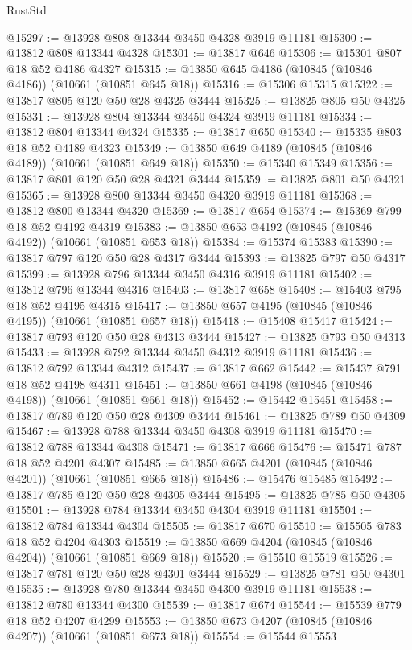 \begin{lexlean}{RustStd}
\begin{coremodule}
@15297 := @13928 @808 @13344 @3450 @4328 @3919 @11181
@15300 := @13812 @808 @13344 @4328
@15301 := @13817 @646
@15306 := @15301 @807 @18 @52 @4186 @4327
@15315 := @13850 @645 @4186 (@10845 (@10846 @4186)) (@10661 (@10851 @645 @18))
@15316 := @15306 @15315
@15322 := @13817 @805 @120 @50 @28 @4325 @3444
@15325 := @13825 @805 @50 @4325
@15331 := @13928 @804 @13344 @3450 @4324 @3919 @11181
@15334 := @13812 @804 @13344 @4324
@15335 := @13817 @650
@15340 := @15335 @803 @18 @52 @4189 @4323
@15349 := @13850 @649 @4189 (@10845 (@10846 @4189)) (@10661 (@10851 @649 @18))
@15350 := @15340 @15349
@15356 := @13817 @801 @120 @50 @28 @4321 @3444
@15359 := @13825 @801 @50 @4321
@15365 := @13928 @800 @13344 @3450 @4320 @3919 @11181
@15368 := @13812 @800 @13344 @4320
@15369 := @13817 @654
@15374 := @15369 @799 @18 @52 @4192 @4319
@15383 := @13850 @653 @4192 (@10845 (@10846 @4192)) (@10661 (@10851 @653 @18))
@15384 := @15374 @15383
@15390 := @13817 @797 @120 @50 @28 @4317 @3444
@15393 := @13825 @797 @50 @4317
@15399 := @13928 @796 @13344 @3450 @4316 @3919 @11181
@15402 := @13812 @796 @13344 @4316
@15403 := @13817 @658
@15408 := @15403 @795 @18 @52 @4195 @4315
@15417 := @13850 @657 @4195 (@10845 (@10846 @4195)) (@10661 (@10851 @657 @18))
@15418 := @15408 @15417
@15424 := @13817 @793 @120 @50 @28 @4313 @3444
@15427 := @13825 @793 @50 @4313
@15433 := @13928 @792 @13344 @3450 @4312 @3919 @11181
@15436 := @13812 @792 @13344 @4312
@15437 := @13817 @662
@15442 := @15437 @791 @18 @52 @4198 @4311
@15451 := @13850 @661 @4198 (@10845 (@10846 @4198)) (@10661 (@10851 @661 @18))
@15452 := @15442 @15451
@15458 := @13817 @789 @120 @50 @28 @4309 @3444
@15461 := @13825 @789 @50 @4309
@15467 := @13928 @788 @13344 @3450 @4308 @3919 @11181
@15470 := @13812 @788 @13344 @4308
@15471 := @13817 @666
@15476 := @15471 @787 @18 @52 @4201 @4307
@15485 := @13850 @665 @4201 (@10845 (@10846 @4201)) (@10661 (@10851 @665 @18))
@15486 := @15476 @15485
@15492 := @13817 @785 @120 @50 @28 @4305 @3444
@15495 := @13825 @785 @50 @4305
@15501 := @13928 @784 @13344 @3450 @4304 @3919 @11181
@15504 := @13812 @784 @13344 @4304
@15505 := @13817 @670
@15510 := @15505 @783 @18 @52 @4204 @4303
@15519 := @13850 @669 @4204 (@10845 (@10846 @4204)) (@10661 (@10851 @669 @18))
@15520 := @15510 @15519
@15526 := @13817 @781 @120 @50 @28 @4301 @3444
@15529 := @13825 @781 @50 @4301
@15535 := @13928 @780 @13344 @3450 @4300 @3919 @11181
@15538 := @13812 @780 @13344 @4300
@15539 := @13817 @674
@15544 := @15539 @779 @18 @52 @4207 @4299
@15553 := @13850 @673 @4207 (@10845 (@10846 @4207)) (@10661 (@10851 @673 @18))
@15554 := @15544 @15553

\end{coremodule}
\end{lexlean}
